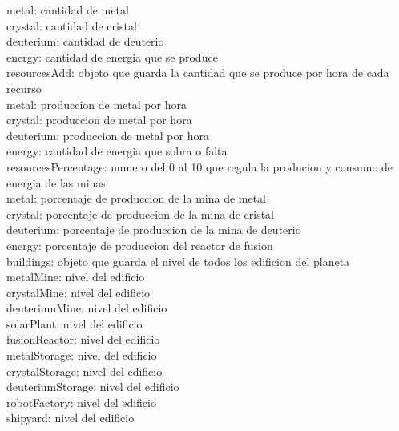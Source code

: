 \documentclass{article}
\newcommand\tab[1][1cm]{\hspace*{#1}}
\begin{document}
            \tab\tab metal: cantidad de metal\\
            \tab\tab crystal: cantidad de cristal\\
            \tab\tab deuterium: cantidad de deuterio\\
            \tab\tab energy: cantidad de energia que se produce\\
            \tab resourcesAdd: objeto que guarda la cantidad que se produce por hora de cada recurso\\
            \tab\tab metal: produccion de metal por hora\\
            \tab\tab crystal: produccion de metal por hora\\
            \tab\tab deuterium: produccion de metal por hora\\
            \tab\tab energy: cantidad de energia que sobra o falta\\
            \tab resourcesPercentage: numero del 0 al 10 que regula la producion y consumo de energia de las minas\\
            \tab\tab metal: porcentaje de produccion de la mina de metal\\
            \tab\tab crystal: porcentaje de produccion de la mina de cristal\\
            \tab\tab deuterium: porcentaje de produccion de la mina de deuterio\\
            \tab\tab energy: porcentaje de produccion del reactor de fusion\\
            \tab buildings: objeto que guarda el nivel de todos los edificion del planeta\\
            \tab\tab metalMine: nivel del edificio\\
            \tab\tab crystalMine: nivel del edificio\\
            \tab\tab deuteriumMine: nivel del edificio\\
            \tab\tab solarPlant: nivel del edificio\\
            \tab\tab fusionReactor: nivel del edificio\\
            \tab\tab metalStorage: nivel del edificio\\
            \tab\tab crystalStorage: nivel del edificio\\
            \tab\tab deuteriumStorage: nivel del edificio\\
            \tab\tab robotFactory: nivel del edificio\\
            \tab\tab shipyard: nivel del edificio\\
\end{document}
